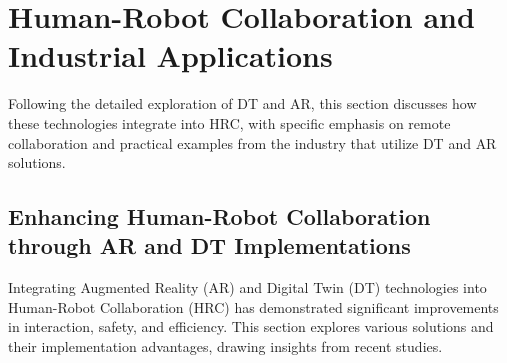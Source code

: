 \section{Human-Robot Collaboration and Industrial Applications}
Following the detailed exploration of \ac{DT} and \ac{AR}, this section discusses how these technologies integrate into \ac{HRC}, with specific emphasis 
on remote collaboration and practical examples from the industry that utilize \ac{DT} and \ac{AR} solutions.

\subsection{Enhancing Human-Robot Collaboration through AR and DT Implementations}

Integrating Augmented Reality (AR) and Digital Twin (DT) technologies into Human-Robot Collaboration (HRC) has demonstrated significant improvements in 
interaction, safety, and efficiency. This section explores various solutions and their implementation advantages, drawing insights from recent studies.


